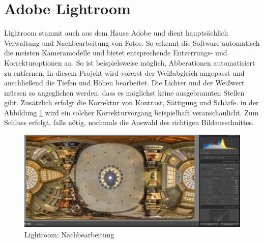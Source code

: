 \documentclass[liststotoc,bibtotoc,fontsize=14pt,]{scrreprt}
\begin{document}
	\section{Adobe Lightroom}
	\label{sec:lightroom}
	Lightroom stammt auch aus dem Hause Adobe und dient hauptsächlich Verwaltung und Nachbearbeitung von Fotos. So erkennt die Software automatisch die meisten Kameramodelle und bietet entsprechende Entzerrungs- und Korrekturoptionen an. So ist beispielsweise möglich, Abberationen automatisiert zu entfernen. In diesem Projekt wird vorerst der Weißabgleich angepasst und anschließend die Tiefen und Höhen bearbeitet. Die Lichter und der Weißwert müssen so angeglichen werden, dass es möglichst keine ausgebrannten Stellen gibt. Zusätzlich erfolgt die Korrektur von Kontrast, Sättigung und Schärfe. in der Abbildung \ref{img:lightroom_bearbeitung} wird ein solcher Korrekturvorgang beispielhaft veranschaulicht. Zum Schluss erfolgt, falls nötig, nochmals die Auswahl des richtigen Bildausschnittes.
	\begin{figure}[H]
		\includegraphics[width=\linewidth]{img/steps/Lightroom_kugel.PNG}
		\caption{Lightroom: Nachbearbeitung}
		\label{img:lightroom_bearbeitung}
	\end{figure}

	
	\begin{thebibliography}{999}
	
		
	\end{thebibliography}
	
\end{document}

